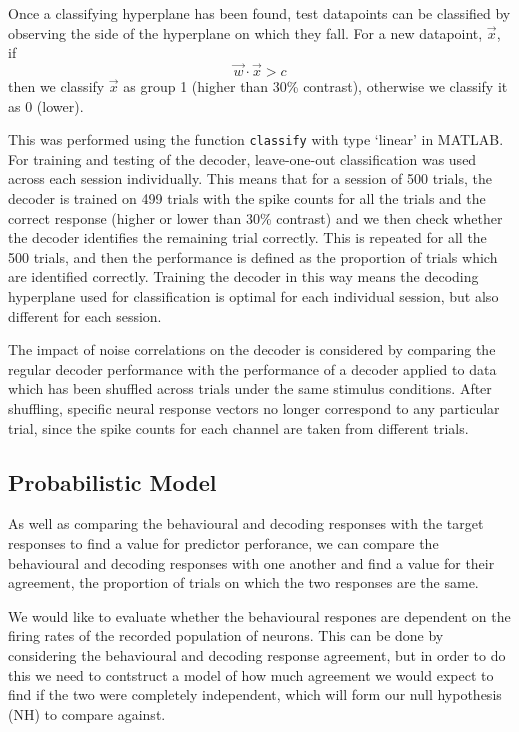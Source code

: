 Once a classifying hyperplane has been found, test datapoints can be classified by observing the side of the hyperplane on which they fall. For a new datapoint, $\vec{x}$,  if
\begin{equation}
\vec{w}\cdot\vec{x}>c
\end{equation}
then we classify $\vec{x}$ as group 1 (higher than 30\% contrast), otherwise we classify it as 0 (lower).

This was performed using the function \texttt{classify} with type `linear' in MATLAB. For training and testing of the decoder, leave-one-out classification was used across each session individually. This means that for a session of 500 trials, the decoder is trained on 499 trials with the spike counts for all the trials and the correct response (higher or lower than 30\% contrast) and we then check whether the decoder identifies the remaining trial correctly.
This is repeated for all the 500 trials, and then the performance is defined as the proportion of trials which are identified correctly. Training the decoder in this way means the decoding hyperplane used for classification is optimal for each individual session, but also different for each session.

The impact of noise correlations on the decoder is considered by comparing the regular decoder performance with the performance of a decoder applied to data which has been shuffled across trials under the same stimulus conditions. After shuffling, specific neural response vectors no longer correspond to any particular trial, since the spike counts for each channel are taken from different trials.

\subsection{Probabilistic Model}
\label{sec:dec-meth-prob}

As well as comparing the behavioural and decoding responses with the target responses to find a value for predictor perforance, we can compare the behavioural and decoding responses with one another and find a value for their agreement, the proportion of trials on which the two responses are the same.

We would like to evaluate whether the behavioural respones are dependent on the firing rates of the recorded population of neurons. This can be done by considering the behavioural and decoding response agreement, but in order to do this we need to contstruct a model of how much agreement we would expect to find if the two were completely independent, which will form our null hypothesis (NH) to compare against.

